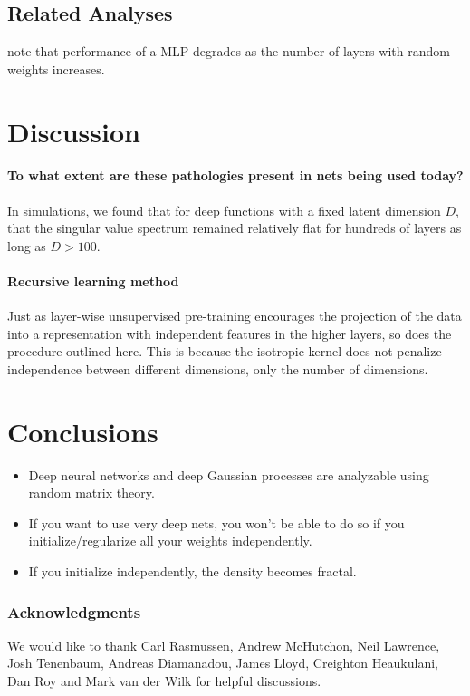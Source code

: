 \documentclass{article}
\begin{document}
\subsection{Related Analyses}

\cite{montavon2010layer} note that performance of a MLP degrades as the number of layers with random weights increases.

\section{Discussion}

\paragraph{To what extent are these pathologies present in nets being used today?}  In simulations, we found that for deep functions with a fixed latent dimension $D$, that the singular value spectrum remained relatively flat for hundreds of layers as long as $D > 100$.




\paragraph{Recursive learning method}

Just as layer-wise unsupervised pre-training encourages the projection of the data into a representation with independent features in the higher layers, so does the procedure outlined here.  This is because the isotropic kernel does not penalize independence between different dimensions, only the number of dimensions.




\section{Conclusions}

\begin{itemize}
\item Deep neural networks and deep Gaussian processes are analyzable using random matrix theory.
\item If you want to use very deep nets, you won't be able to do so if you initialize/regularize all your weights independently.
\item If you initialize independently, the density becomes fractal.
\end{itemize}


\subsubsection*{Acknowledgments}

We would like to thank Carl Rasmussen, Andrew McHutchon, Neil Lawrence, Josh Tenenbaum, Andreas Diamanadou, James Lloyd, Creighton Heaukulani, Dan Roy and Mark van der Wilk for helpful discussions.



\end{document}
